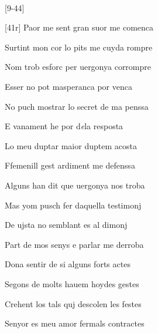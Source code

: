 \documentclass[12pt]{article}
\renewcommand{\espaiAbansEtiquetaPoema}{\vspace{0ex}}
\begin{document}
\begin{estrofa}

\espaiAbansEtiquetaPoema

\\

\end{estrofa}




\begin{estrofaBuida}


\end{estrofaBuida}


\begin{estrofaExtra}%




\begin{Versos}

[9-44]

\end{Versos}


\end{estrofaExtra}


\begin{estrofa}

 [41r] Paor me sent gran suor me comenca

 Surtint mon cor lo pits me cuyda rompre

 Nom trob esforc per uergonya corrompre

 Esser no pot masperanca por venca

 No puch mostrar lo secret de ma penssa

 E vanament he por d\textit{e}la resposta

 Lo meu duptar maior duptem acosta

 Ffemenill gest ardiment me defenssa

\end{estrofa}



\begin{estrofa}

 Alguns han dit que uergonya nos troba

 Mas yom pusch fer daquella testimonj

 De ujsta no semblant es al dimonj

 Part de mos senys e parlar me derroba

 Dona sentir de si alguns forts actes

 Segons de molts hauem hoydes gestes

 Crehent los tals quj descolen les festes

 Senyor es meu amor fermals contractes

\end{estrofa}
\end{document}

